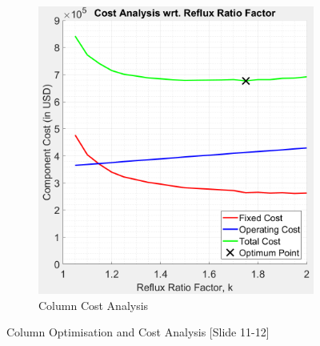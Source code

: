 \begin{figure}[ht]
\begin{subfigure}{0.49\textwidth}
            \includegraphics[width=\linewidth]{airseparation/handouts/graphics/column_cost_vs_reflux_va.jpeg}
            \caption{Column Cost Analysis }%
            \label{fig:cost_vs_R}
        \end{subfigure}
        \caption{Column Optimisation and Cost Analysis [Slide 11-12]}
        \label{fig:cost_analysis}
    \end{figure}
    
